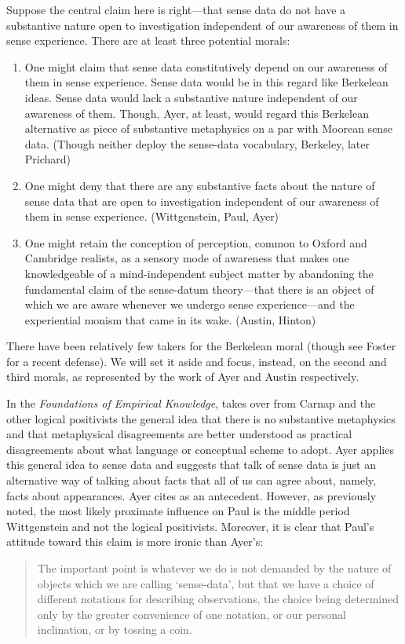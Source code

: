 Suppose the central claim here is right---that sense data do not have a substantive nature open to investigation independent of our awareness of them in sense experience. There are at least three potential morals:

\begin{enumerate}
	\item One might claim that sense data constitutively depend on our awareness of them in sense experience. Sense data would be in this regard like Berkelean ideas. Sense data would lack a substantive nature independent of our awareness of them. Though, Ayer, at least, would regard this Berkelean alternative as piece of substantive metaphysics on a par with Moorean sense data. (Though neither deploy the sense-data vocabulary, Berkeley, later Prichard)
	\item One might deny that there are any substantive facts about the nature of sense data that are open to investigation independent of our awareness of them in sense experience. (Wittgenstein, Paul, Ayer)
	\item One might retain the conception of perception, common to Oxford and Cambridge realists, as a sensory mode of awareness that makes one knowledgeable of a mind-independent subject matter by abandoning the fundamental claim of the sense-datum theory---that there is an object of which we are aware whenever we undergo sense experience---and the experiential monism that came in its wake. (Austin, Hinton)
\end{enumerate}

There have been relatively few takers for the Berkelean moral (though see Foster \citeyear{Foster:00ny} for a recent defense). We will set it aside and focus, instead, on the second and third morals, as represented by the work of Ayer and Austin respectively.

In the \emph{Foundations of Empirical Knowledge}, \citet{Ayer:1958kx} takes over from Carnap and the other logical positivists the general idea that there is no substantive metaphysics and that metaphysical disagreements are better understood as practical disagreements about what language or conceptual scheme to adopt. Ayer applies this general idea to sense data and suggests that talk of sense data is just an alternative way of talking about facts that all of us can agree about, namely, facts about appearances. Ayer cites \citet{Paul:1936kd} as an antecedent. However, as previously noted, the most likely proximate influence on Paul is the middle period Wittgenstein and not the logical positivists. Moreover, it is clear that Paul's attitude toward this claim is more ironic than Ayer's:
\begin{quote}
    The important point is whatever we do is not demanded by the nature of objects which we are calling `sense-data', but that we have a choice of different notations for describing observations, the choice being determined only by the greater convenience of one notation, or our personal inclination, or by tossing a coin. \citep[74]{Paul:1936kd}
\end{quote}

